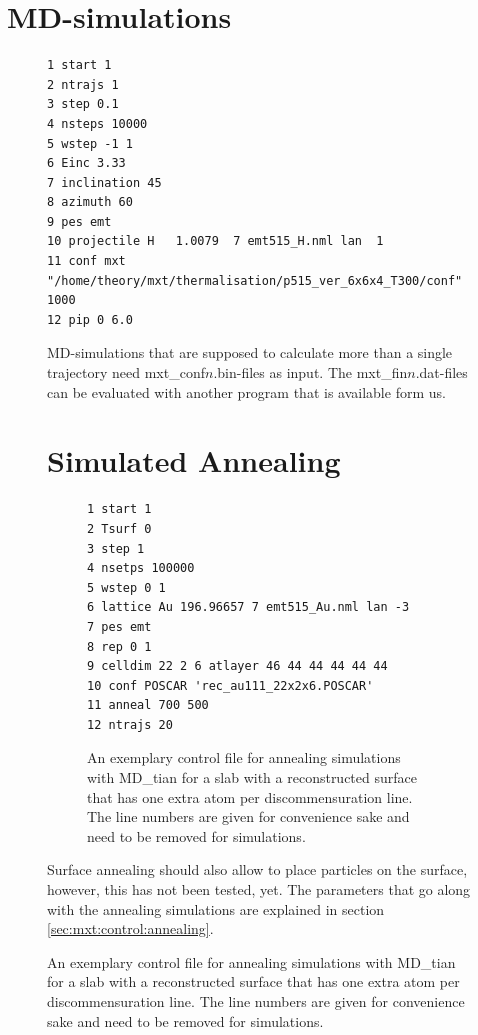 \documentclass[twoside, 11pt, titlepage, captions=nooneline, a4paper, headsepline]{scrbook}%
\newcommand{\9}{\mathrm}
\newcommand{\0}{\,\mathrm}
\begin{document}
\section{MD-simulations}
\begin{figure}[b!]
\centering
\begin{verbatim}
1 start 1
2 ntrajs 1
3 step 0.1
4 nsteps 10000
5 wstep -1 1
6 Einc 3.33
7 inclination 45
8 azimuth 60
9 pes emt
10 projectile H   1.0079  7 emt515_H.nml lan  1
11 conf mxt "/home/theory/mxt/thermalisation/p515_ver_6x6x4_T300/conf" 1000
12 pip 0 6.0
\end{verbatim}
\caption{\label{Fig:mxt:MDsimulation}A control file used in MD\_tian for a typical MD-simulation. The line numbers are given for convenience sake and need to be removed for simulations.}
MD-simulations that are supposed to calculate more than a single trajectory need mxt\_conf$n$.bin-files as input. The mxt\_fin$n$.dat-files can be evaluated with another program that is available form us.

\section{Simulated Annealing}
\begin{figure}[b!]
\begin{verbatim}
1 start 1
2 Tsurf 0
3 step 1
4 nsetps 100000
5 wstep 0 1
6 lattice Au 196.96657 7 emt515_Au.nml lan -3
7 pes emt
8 rep 0 1
9 celldim 22 2 6 atlayer 46 44 44 44 44 44
10 conf POSCAR 'rec_au111_22x2x6.POSCAR'
11 anneal 700 500
12 ntrajs 20
\end{verbatim}
\caption{\label{Fig:mxt:anneal}An exemplary control file for annealing simulations with MD\_tian for a slab with a reconstructed surface that has one extra atom per discommensuration line. The line numbers are given for convenience sake and need to be removed for simulations.}
\end{figure}
Surface annealing should also allow to place particles on the surface, however, this has not been tested, yet. The parameters that go along with the annealing simulations are explained in section\,\ref{sec:mxt:control:annealing}.



\end{figure}
\end{document}
